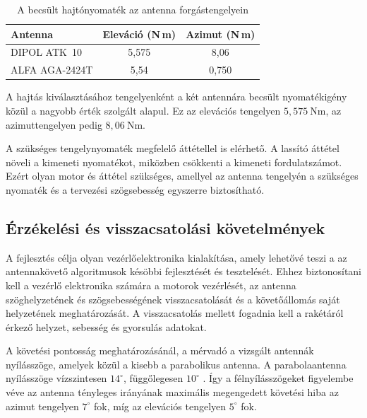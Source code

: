 \begin{table}[H]
    \centering
    \caption{A becsült hajtónyomaték az antenna forgástengelyein}
    \label{tab:hajtonyomatek-osszesites}
    \renewcommand{\arraystretch}{1.2}
    \begin{tabular}{|l|c|c|}
        \hline
        \rowcolor{blue!15}
        \textbf{Antenna} & \textbf{Eleváció} (N\,m)
                         & \textbf{Azimut} (N\,m) \\
        \hline
        DIPOL ATK~10 & 5,575 & 8,06 \\
        \hline
        ALFA AGA-2424T & 5,54 & 0,750 \\
        \hline
    \end{tabular}
\end{table}

A hajtás kiválasztásához tengelyenként a két antennára
becsült nyomatékigény közül a nagyobb érték szolgált
alapul. Ez az elevációs tengelyen $5{,}575~\mathrm{Nm}$,
az azimuttengelyen pedig $8{,}06~\mathrm{Nm}$.

A szükséges tengelynyomaték megfelelő áttétellel is
elérhető. A lassító áttétel növeli a kimeneti nyomatékot,
miközben csökkenti a kimeneti fordulatszámot. Ezért
olyan motor és áttétel szükséges, amellyel az antenna
tengelyén a szükséges nyomaték és a tervezési
szögsebesség egyszerre biztosítható.

\subsection{Érzékelési és visszacsatolási követelmények}

A fejlesztés célja olyan vezérlőelektronika kialakítása, amely lehetővé teszi
a az antennakövető algoritmusok késöbbi fejlesztését és tesztelését.
Ehhez biztonosítani kell a vezérlő elektronika számára a motorok
vezérlését, az antenna szöghelyzetének és szögsebességének visszacsatolását 
és a követőállomás saját helyzetének meghatározását.
A visszacsatolás mellett fogadnia kell a rakétáról érkező helyzet, sebesség
és gyorsulás adatokat.

A követési pontosság meghatározásánál, a mérvadó a vizsgált antennák nyílásszöge,
amelyek közül a kisebb a parabolikus antenna.
A parabolaantenna nyílásszöge vízszintesen $14^\circ$, 
függőlegesen $10^\circ$ \cite{parabolic-antenna}. 
Így a félnyílásszögeket figyelembe véve az antenna tényleges irányának
maximális megengedett követési hiba az azimut tengelyen $7^\circ$ fok, míg
az elevációs tengelyen $5^\circ$ fok. 

